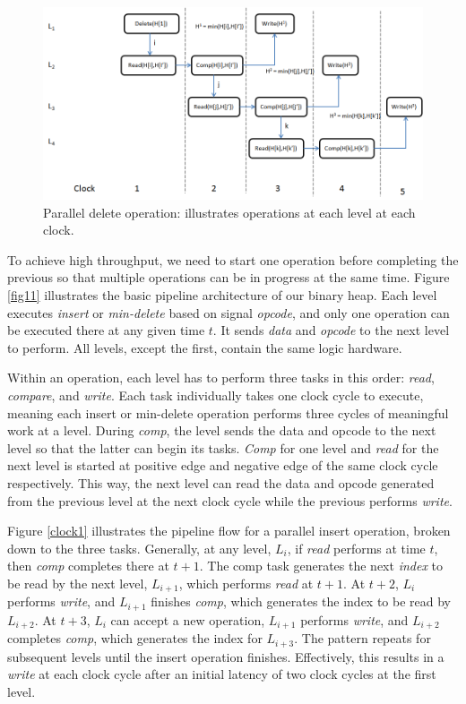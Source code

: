 \begin{figure}[!ht]
  \centering
  \includegraphics[width=12cm]{fig/clock2.png}
      \caption{Parallel delete operation: illustrates operations at each level at each clock.  }
    \label{clock2}
\end{figure}

To achieve high throughput, we need to start one operation before completing the previous so that multiple operations can be in progress at the same time.
Figure \ref{fig11} illustrates the basic pipeline architecture of our binary heap.
Each level executes {\it insert} or {\it min-delete} based on signal {\it opcode}, and only one operation can be executed there at any given time $t$.
It sends {\it data} and {\it opcode} to the next level to perform.
All levels, except the first, contain the same logic hardware.

Within an operation, each level has to perform three tasks in this order: {\it read}, {\it compare}, and {\it write}.
Each task individually takes one clock cycle to execute, meaning each insert or min-delete operation performs three cycles of meaningful work at a level.
During {\it comp}, the level sends the data and opcode to the next level so that the latter can begin its tasks.
{\it Comp} for one level and {\it read} for the next level is started at positive edge and negative edge of the same clock cycle respectively. This way, the next level can read the data and opcode generated from the previous level at the next clock cycle while the previous performs {\it write}.


Figure \ref{clock1} illustrates the pipeline flow for a parallel insert operation, broken down to the three tasks.
Generally, at any level, $L_i$, if {\it read} performs at time $t$, then {\it comp} completes there at $t+1$.
The comp task generates the next {\it index} to be read by the next level, $L_{i+1}$, which performs {\it read} at $t+1$.
At $t+2$, $L_i$ performs {\it write}, and $L_{i+1}$ finishes {\it comp}, which generates the index to be read by $L_{i+2}$.
At $t+3$, $L_i$ can accept a new operation, $L_{i+1}$ performs {\it write}, and $L_{i+2}$ completes {\it comp}, which generates the index for $L_{i+3}$. 
The pattern repeats for subsequent levels until the insert operation finishes.
Effectively, this results in a {\it write} at each clock cycle after an initial latency of two clock cycles at the first level.


